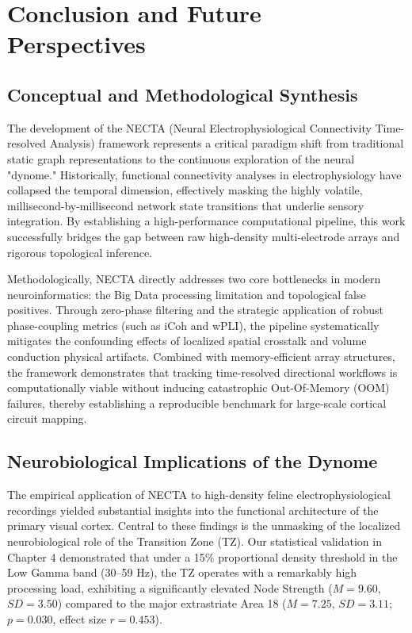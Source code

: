 \chapter{Conclusion and Future Perspectives}
\label{ch:conclusion}

\section{Conceptual and Methodological Synthesis}
The development of the NECTA (Neural Electrophysiological Connectivity Time-resolved Analysis) framework represents a critical paradigm shift from traditional static graph representations to the continuous exploration of the neural "dynome." Historically, functional connectivity analyses in electrophysiology have collapsed the temporal dimension, effectively masking the highly volatile, millisecond-by-millisecond network state transitions that underlie sensory integration. By establishing a high-performance computational pipeline, this work successfully bridges the gap between raw high-density multi-electrode arrays and rigorous topological inference. 

Methodologically, NECTA directly addresses two core bottlenecks in modern neuroinformatics: the Big Data processing limitation and topological false positives. Through zero-phase filtering and the strategic application of robust phase-coupling metrics (such as iCoh and wPLI), the pipeline systematically mitigates the confounding effects of localized spatial crosstalk and volume conduction physical artifacts. Combined with memory-efficient array structures, the framework demonstrates that tracking time-resolved directional workflows is computationally viable without inducing catastrophic Out-Of-Memory (OOM) failures, thereby establishing a reproducible benchmark for large-scale cortical circuit mapping.

\section{Neurobiological Implications of the Dynome}
The empirical application of NECTA to high-density feline electrophysiological recordings yielded substantial insights into the functional architecture of the primary visual cortex. Central to these findings is the unmasking of the localized neurobiological role of the Transition Zone (TZ). Our statistical validation in Chapter 4 demonstrated that under a 15\% proportional density threshold in the Low Gamma band (30--59 Hz), the TZ operates with a remarkably high processing load, exhibiting a significantly elevated Node Strength ($M = 9.60$, $SD = 3.50$) compared to the major extrastriate Area 18 ($M = 7.25$, $SD = 3.11$; $p = 0.030$, effect size $r = 0.453$). 

